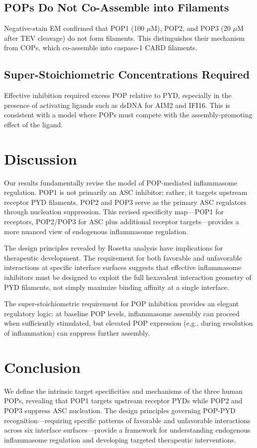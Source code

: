 \documentclass[11pt]{article}
\begin{document}
\subsection{POPs Do Not Co-Assemble into Filaments}

Negative-stain EM confirmed that POP1 (100 $\mu$M), POP2, and POP3 (20 $\mu$M after TEV cleavage) do not form filaments. This distinguishes their mechanism from COPs, which co-assemble into caspase-1 CARD filaments.

\subsection{Super-Stoichiometric Concentrations Required}

Effective inhibition required excess POP relative to PYD, especially in the presence of activating ligands such as dsDNA for AIM2 and IFI16. This is consistent with a model where POPs must compete with the assembly-promoting effect of the ligand.

\section{Discussion}

Our results fundamentally revise the model of POP-mediated inflammasome regulation. POP1 is not primarily an ASC inhibitor; rather, it targets upstream receptor PYD filaments. POP2 and POP3 serve as the primary ASC regulators through nucleation suppression. This revised specificity map---POP1 for receptors, POP2/POP3 for ASC plus additional receptor targets---provides a more nuanced view of endogenous inflammasome regulation.

The design principles revealed by Rosetta analysis have implications for therapeutic development. The requirement for both favorable and unfavorable interactions at specific interface surfaces suggests that effective inflammasome inhibitors must be designed to exploit the full hexavalent interaction geometry of PYD filaments, not simply maximize binding affinity at a single interface.

The super-stoichiometric requirement for POP inhibition provides an elegant regulatory logic: at baseline POP levels, inflammasome assembly can proceed when sufficiently stimulated, but elevated POP expression (e.g., during resolution of inflammation) can suppress further assembly.

\section{Conclusion}

We define the intrinsic target specificities and mechanisms of the three human POPs, revealing that POP1 targets upstream receptor PYDs while POP2 and POP3 suppress ASC nucleation. The design principles governing POP-PYD recognition---requiring specific patterns of favorable and unfavorable interactions across six interface surfaces---provide a framework for understanding endogenous inflammasome regulation and developing targeted therapeutic interventions.



\end{document}
